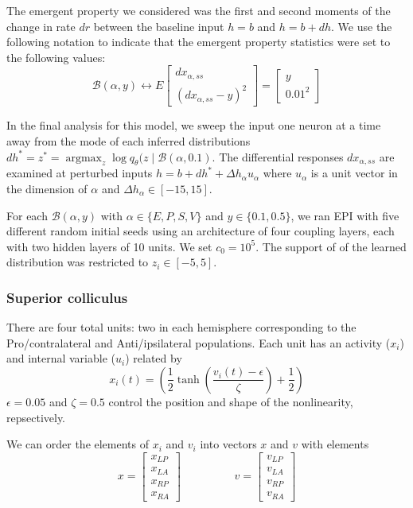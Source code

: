 \documentclass[11pt]{article}
\DeclareMathOperator*{\argmax}{argmax}
\begin{document}
The emergent property we considered was the first and second moments of the change in rate $dr$ between the baseline input $h= b$ and $h = b + dh$.  We use the following notation to indicate that the emergent property statistics were set to the following values:
\begin{equation}
\mathcal{B}(\alpha, y) \leftrightarrow 
E \begin{bmatrix} dx_{\alpha,ss} \\ (dx_{\alpha,ss} - y)^2 \end{bmatrix} = \begin{bmatrix} y \\ 0.01^2 \end{bmatrix}
\end{equation}

In the final analysis for this model, we sweep the input one neuron at a time away from the mode of each inferred distributions $dh^* = z^* = \argmax_{z} \log q_\theta(z \mid \mathcal{B}(\alpha, 0.1)$.
The differential responses $dx_{\alpha,ss}$ are examined at perturbed inputs  $h = b + dh^* + \Delta h_\alpha u_\alpha$ where $u_\alpha$ is a unit vector in the dimension of $\alpha$ and $\Delta h_\alpha \in \left[-15,15\right]$.

For each $\mathcal{B}(\alpha, y)$ with $\alpha \in \{E, P, S, V\}$ and $y \in \{0.1, 0.5\}$, we ran EPI with five different random initial seeds using an architecture of four coupling layers, each with two hidden layers of 10 units.  We set $c_0 = 10^5$.  The support of of the learned distribution was restricted to $z_i \in \left[-5, 5\right]$.


\subsubsection{Superior colliculus}\label{methods_SC}
There are four total units: two in each hemisphere corresponding to the Pro/contralateral and Anti/ipsilateral populations.  Each unit has an activity ($x_i$) and internal variable ($u_i$) related by
\begin{equation}
x_i(t) =\left(\frac{1}{2}\tanh\left(\frac{v_i(t) - \epsilon}{\zeta}\right)+ \frac{1}{2} \right)
\end{equation}
$\epsilon = 0.05$ and $\zeta = 0.5$ control the position and shape of the nonlinearity, repsectively.

We can order the elements of $x_i$ and $v_i$ into vectors $x$ and $v$ with elements
\begin{equation}
x = \begin{bmatrix} x_{LP} \\ x_{LA} \\ x_{RP} \\ x_{RA} \end{bmatrix} \hspace{2cm} v = \begin{bmatrix} v_{LP} \\ v_{LA} \\ v_{RP} \\ v_{RA} \end{bmatrix}
\end{equation}
\end{document}

